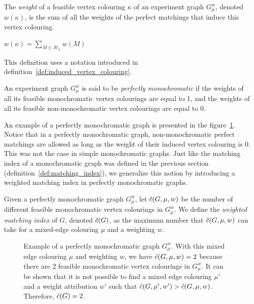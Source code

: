 \begin{definition}
    \label{def:vertex_colouring_weight}
    The \textit{weight} of a feasible vertex colouring $\kappa$ of an experiment graph $G_\mu^w$, denoted $w(\kappa)$, is the sum of all the weights of the perfect matchings that induce this vertex colouring.
    
    \begin{center}
        $w(\kappa) = \sum\limits_{M \in \mathcal{M}_{\kappa}} w(M)$
    \end{center}

    This definition uses a notation introduced in definition~\ref{def:induced_vertex_colouring}.
\end{definition}

\begin{definition}
    \label{def:perfectly_monochromatic_graph}
    An experiment graph $G_\mu^w$ is said to be \textit{perfectly monochromatic} if the weights of all its feasible monochromatic vertex colourings are equal to 1, and the weights of all its feasible non-monochromatic vertex colourings are equal to 0.
\end{definition}

An example of a perfectly monochromatic graph is presented in the figure~\ref{fig:perfectly_mono}.
Notice that in a perfectly monochromatic graph, non-monochromatic perfect matchings are allowed as long as the weight of their induced vertex colouring is 0.
This was not the case in simple monochromatic graphs.
Just like the matching index of a monochromatic graph was defined in the previous section (definition~\ref{def:matching_index}), we generalize this notion by introducing a weighted matching index in perfectly monochromatic graphs.

\begin{definition}
    \label{def:weighted_matching_index}
    Given a perfectly monochromatic graph $G_\mu^w$, let $\Tilde{c}(G, \mu, w)$ be the number of different feasible monochromatic vertex colourings in $G_\mu^w$.
    We define the \textit{weighted matching index} of $G$, denoted $\Tilde{c}(G)$, as the maximum number that $\Tilde{c}(G, \mu, w)$ can take for a mixed-edge colouring $\mu$ and a weighting $w$.
\end{definition}

\begin{figure}[H]
    \caption{Example of a perfectly monochromatic graph $G_\mu^w$.
        With this mixed edge colouring $\mu$ and weighting $w$, we have $\Tilde{c}(G, \mu, w) = 2$ because there are 2 feasible monochromatic vertex colourings in $G_\mu^w$.
        It can be shown that it is not possible to find a mixed edge colouring $\mu'$ and a weight attribution $w'$ such that $\Tilde{c}(G, \mu', w') > \Tilde{c}(G, \mu, w)$.
        Therefore, $\Tilde{c}(G) = 2$.}
    \label{fig:perfectly_mono}
\end{figure}

